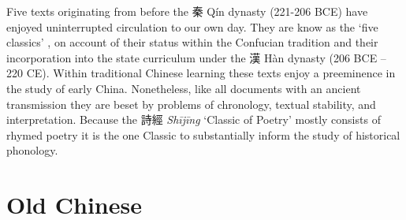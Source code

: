 Five texts originating from before the 秦 Qín dynasty (221-206 BCE) have
enjoyed un­in­ter­rupted circulation to our own day. They are know as
the `five classics' \citep{Nylan2001}, on account of their status within the
Confucian tradition and their incorporation into the state curriculum
under the 漢 Hàn dynasty (206 BCE -- 220 CE). Within traditional Chinese
learning these texts enjoy a preeminence in the study of early China.
Nonetheless, like all documents with an ancient transmission they are
beset by problems of chronology, textual stability, and interpretation.
Because the 詩經  \emph{Shījīng} `Classic of Poetry' mostly consists of
rhymed poetry it is the one Classic to substantially inform the study of
historical phonology.

\section{Old Chinese}\label{old-chinese}

